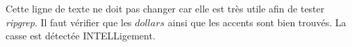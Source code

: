 \begin{exercise}[title=Ripgrep succeeds]
	Cette ligne de texte ne doit pas changer car elle est très utile afin de
	tester \emph{ripgrep}. Il faut vérifier que les $dollars$ ainsi que les
	accents sont bien trouvés. La casse est détectée INTELLigement.
\end{exercise}
